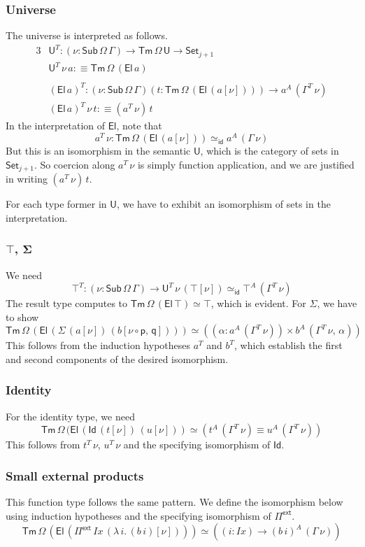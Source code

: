 \documentclass[12pt,a4paper,twoside,openany]{book}
\theoremstyle{remark}
\theoremstyle{definition}
\theoremstyle{theorem}
\newcommand{\mi}[1]{\mathit{#1}}
\newcommand{\bs}[1]{\boldsymbol{#1}}
\newcommand{\id}{\mathsf{id}}
\newcommand{\Sub}{\mathsf{Sub}}
\newcommand{\Tm}{\mathsf{Tm}}
\newcommand{\U}{\mathsf{U}}
\newcommand{\El}{\mathsf{El}}
\newcommand{\Id}{\mathsf{Id}}
\newcommand{\Set}{\mathsf{Set}}
\newcommand{\Piinf}{\Pi^{\mathsf{ext}}}
\newcommand{\p}{\mathsf{p}}
\newcommand{\q}{\mathsf{q}}
\newcommand{\defn}{:\equiv}
\begin{document}
\subsubsection{Universe}
The universe is interpreted as follows.
\begin{alignat*}{3}
  &\U^T : (\nu : \Sub\,\Omega\,\Gamma) \to \Tm\,\Omega\,\U \to \Set_{j + 1} \\
  &\U^T\,\nu\,a \defn \Tm\,\Omega\,(\El\,a) \\
  &\\
  &(\El\,a)^T : (\nu : \Sub\,\Omega\,\Gamma)(t : \Tm\,\Omega\,(\El\,(a[\nu]))) \to a^A\,(\Gamma^T\,\nu)\\
  &(\El\,a)^T\,\nu\,t \defn (a^T\,\nu)\,t
\end{alignat*}
In the interpretation of $\El$, note that
\[
a^T\,\nu : \Tm\,\Omega\,(\El\,(a[\nu])) \simeq_{\id} a^A\,(\Gamma\,\nu)
\]
But this is an isomorphism in the semantic $\U$, which is the category of sets
in $\Set_{j + 1}$. So coercion along $a^T\,\nu$ is simply function application,
and we are justified in writing $(a^T\,\nu)\,t$.

For each type former in $\U$, we have to exhibit an isomorphism of sets in the
interpretation.

\subsubsection{$\bs{\top}$, $\bs{\Sigma}$}
We need
\[
  \top^T : (\nu : \Sub\,\Omega\,\Gamma) \to \U^T\,\nu\,(\top[\nu]) \simeq_{\id} \top^A\,(\Gamma^T\,\nu)
\]
The result type computes to $\Tm\,\Omega\,(\El\,\top) \simeq \top$, which is evident. For $\Sigma$, we
have to show
\[
   \Tm\,\Omega\,(\El\,(\Sigma\,(a[\nu])\,(b[\nu\circ\p,\,\q]))) \simeq ((\alpha : a^A\,(\Gamma^T\,\nu)) \times b^A\,(\Gamma^T\,\nu,\,\alpha))
\]
This follows from the induction hypotheses $a^T$ and $b^T$, which establish the
first and second components of the desired isomorphism.

\subsubsection{Identity}
For the identity type, we need
\[
  \Tm\,\Omega\,(\El\,(\Id\,(t[\nu])\,(u[\nu])) \simeq (t^A\,(\Gamma^T\,\nu) \equiv u^A\,(\Gamma^T\,\nu))
\]
This follows from $t^T\,\nu$, $u^T\,\nu$ and the specifying isomorphism of
$\Id$.

\subsubsection{Small external products}
This function type follows the same pattern. We define the isomorphism below
using induction hypotheses and the specifying isomorphism of $\Piinf$.
\[
\Tm\,\Omega\,(\El\,(\Piinf\,\mi{Ix}\,(\lambda\,i.\,(b\,i)[\nu])))
\simeq
((i : \mi{Ix}) \to (b\,i)^A\,(\Gamma\,\nu))
\]
\end{document}

